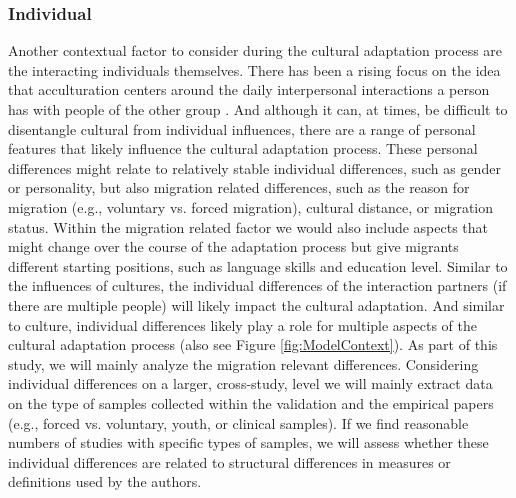\documentclass[man, 12pt, a4paper]{apa7}
\begin{document}
\subsubsection{Individual} 
Another contextual factor to consider during the cultural adaptation process are the interacting individuals themselves. There has been a rising focus on the idea that acculturation centers around the daily interpersonal interactions a person has with people of the other group \citep{Maxwell2017, Sam2010}. And although it can, at times, be difficult to disentangle cultural from individual influences, there are a range of personal features that likely influence the cultural adaptation process. These personal differences might relate to relatively stable individual differences, such as gender or personality, but also migration related differences, such as the reason for migration (e.g., voluntary vs. forced migration), cultural distance, or migration status. Within the migration related factor we would also include aspects that might change over the course of the adaptation process but give migrants different starting positions, such as language skills and education level.
Similar to the influences of cultures, the individual differences of the interaction partners (if there are multiple people) will likely impact the cultural adaptation. And similar to culture, individual differences likely play a role for multiple aspects of the cultural adaptation process (also see Figure \ref{fig:ModelContext}). As part of this study, we will mainly analyze the migration relevant differences. Considering individual differences on a larger, cross-study, level we will mainly extract data on the type of samples collected within the validation and the empirical papers (e.g., forced vs. voluntary, youth, or clinical samples). If we find reasonable numbers of studies with specific types of samples, we will assess whether these individual differences are related to structural differences in measures or definitions used by the authors.
\end{document}
